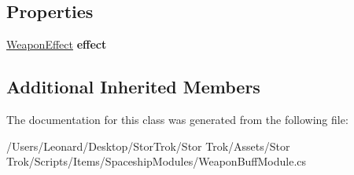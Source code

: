 \subsection*{Properties}
\begin{DoxyCompactItemize}
\item 
\mbox{\label{class_weapon_buff_module_ae2acd3183db0d4353bc8e61f3070abdc}} 
\hyperlink{class_weapon_effect}{Weapon\+Effect} {\bfseries effect}
\end{DoxyCompactItemize}
\subsection*{Additional Inherited Members}


The documentation for this class was generated from the following file\+:\begin{DoxyCompactItemize}
\item 
/\+Users/\+Leonard/\+Desktop/\+Stor\+Trok/\+Stor Trok/\+Assets/\+Stor Trok/\+Scripts/\+Items/\+Spaceship\+Modules/Weapon\+Buff\+Module.\+cs\end{DoxyCompactItemize}
